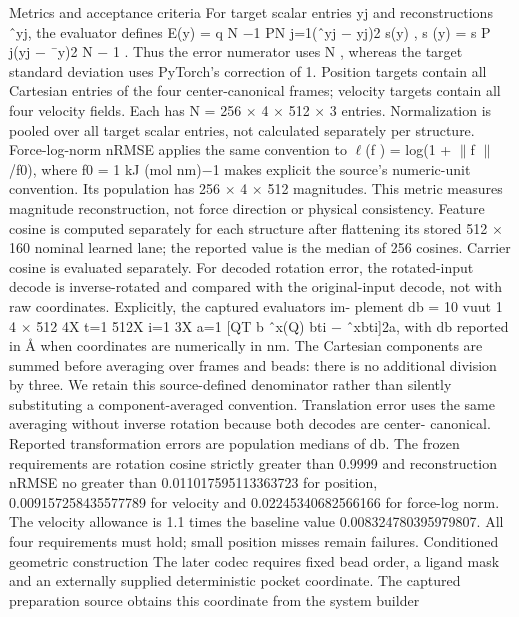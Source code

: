 \documentclass[11pt]{article}
\begin{document}
Metrics and acceptance criteria
For target scalar entries yj and reconstructions ˆyj, the evaluator defines
E(y) =
q
N \ensuremath{-}1 PN
j=1(ˆyj \ensuremath{-} yj)2
s(y) , s (y) =
s P
j(yj \ensuremath{-} ¯y)2
N \ensuremath{-} 1 .
Thus the error numerator uses N , whereas the target standard deviation uses PyTorch’s correction
of 1. Position targets contain all Cartesian entries of the four center-canonical frames; velocity
targets contain all four velocity fields. Each has N = 256 \ensuremath{\times} 4 \ensuremath{\times} 512 \ensuremath{\times} 3 entries. Normalization is
pooled over all target scalar entries, not calculated separately per structure.
Force-log-norm nRMSE applies the same convention to \ensuremath{\ell}(f ) = log(1 + \ensuremath{\parallel}f \ensuremath{\parallel}/f0), where f0 =
1 kJ (mol nm)\ensuremath{-}1 makes explicit the source’s numeric-unit convention. Its population has 256 \ensuremath{\times} 4 \ensuremath{\times}
512 magnitudes. This metric measures magnitude reconstruction, not force direction or physical
consistency.
Feature cosine is computed separately for each structure after flattening its stored 512 \ensuremath{\times} 160
nominal learned lane; the reported value is the median of 256 cosines. Carrier cosine is evaluated
separately. For decoded rotation error, the rotated-input decode is inverse-rotated and compared
with the original-input decode, not with raw coordinates. Explicitly, the captured evaluators im-
plement
db = 10
vuut 1
4 \ensuremath{\times} 512
4X
t=1
512X
i=1
3X
a=1
[QT
b ˆx(Q)
bti \ensuremath{-} ˆxbti]2a,
with db reported in Å when coordinates are numerically in nm. The Cartesian components are
summed before averaging over frames and beads: there is no additional division by three. We retain
this source-defined denominator rather than silently substituting a component-averaged convention.
Translation error uses the same averaging without inverse rotation because both decodes are center-
canonical. Reported transformation errors are population medians of db.
The frozen requirements are rotation cosine strictly greater than 0.9999 and reconstruction
nRMSE no greater than 0.011017595113363723 for position, 0.009157258435577789 for velocity
and 0.02245340682566166 for force-log norm. The velocity allowance is 1.1 times the baseline value
0.008324780395979807. All four requirements must hold; small position misses remain failures.
Conditioned geometric construction
The later codec requires fixed bead order, a ligand mask and an externally supplied deterministic
pocket coordinate. The captured preparation source obtains this coordinate from the system builder
\end{document}
